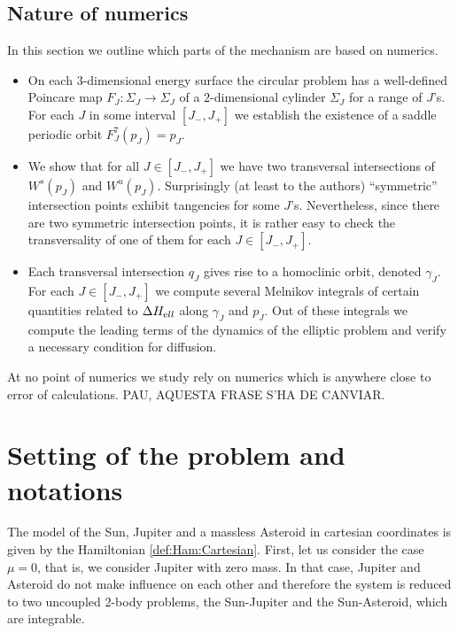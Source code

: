 



\subsection{Nature of numerics}

In this section we outline which parts of the mechanism are based 
on numerics. 

\begin{itemize}
\item On each $3$-dimensional energy surface the circular problem 
has a well-defined Poincare map $F_J:\Sigma_J \to \Sigma_J$ 
of a $2$-dimensional cylinder $\Sigma_J$ for a range of $J$'s. 
For each $J$ in some interval $[J_-,J_+]$ we establish the existence 
of a saddle periodic orbit $F^7_J(p_J)=p_J$. 
 
\item We show that for all $J\in [J_-,J_+]$ we have 
two transversal intersections of $W^s(p_J)$ and $W^u(p_J)$. Surprisingly (at least to the authors) ``symmetric'' 
intersection points exhibit tangencies for some $J$'s. Nevertheless, since there are two symmetric intersection points, it is rather easy to check the transversality of one of them for each $J\in [J_-,J_+]$.
   
\item Each transversal intersection $q_J$ gives rise to a homoclinic 
orbit, denoted $\gamma_J$. For each $J\in [J_-,J_+]$ we compute 
several Melnikov integrals of certain quantities related to 
$\Delta H_{\text ell}$ along $\gamma_J$ and $p_J$. Out of these 
integrals we compute the leading terms of the dynamics of the elliptic problem and 
verify a necessary condition for diffusion. 
\end{itemize}
At no point of numerics we study rely on numerics which 
is anywhere close to error of calculations.  
PAU, AQUESTA FRASE S'HA DE CANVIAR.


\section{Setting of the problem and
  notations}\label{sec:SettingsAndResults}

The model of the Sun, Jupiter and a massless Asteroid in cartesian coordinates
is given by the Hamiltonian \eqref{def:Ham:Cartesian}. First, let us consider
the case $\mu=0$, that is, we consider Jupiter with zero mass. In that case,
Jupiter and Asteroid do not make influence on each other and therefore
the system is reduced to two uncoupled 2-body problems, the Sun-Jupiter and
the Sun-Asteroid, which are integrable.

